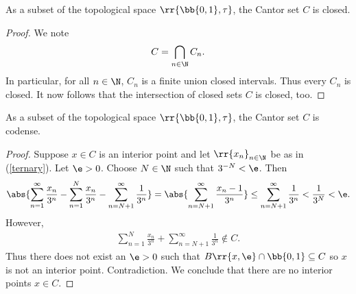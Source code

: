 \documentclass{article}
\begin{document}
\begin{claim*}[2b]
	As a subset of the topological space $\rr{\bb{0,1},\tau}$, the Cantor set $C$ is closed.
	\begin{proof}
		We note
		\begin{align*}
			C = \bigcap_{n\in\N} C_n.
		\end{align*}
		In particular, for all $n\in\N$, $C_n$ is a finite union closed intervals. Thus every
		$C_n$ is closed. It now follows that the intersection of closed sets $C$ is closed, too.
	\end{proof}
\end{claim*}

\begin{claim*}[2c]
	As a subset of the topological space $\rr{\bb{0,1},\tau}$, the Cantor set $C$ is codense.
	\begin{proof}
		Suppose $x\in C$ is an interior point and let $\rr{x_n}_{n\in\N}$ be as in (\ref{ternary}).
		Let $\e>0$. Choose $N\in\N$ such that
		$3^{-N}<\e$. Then
		\begin{align} \label{middle}
			\abs{\sum_{n=1}^{\infty} \frac{x_n}{3^n} - \sum_{n=1}^{N} \frac{x_n}{3^n} - \sum_{n=N+1}^{\infty} \frac{1}{3^n}}
			= \abs{\sum_{n =N+1}^{\infty} \frac{x_n - 1}{3^n}}
			\leq \sum_{n=N+1}^{\infty}\frac{1}{3^n}
			<\frac{1}{3^N}
			<\e.
		\end{align}
		However,
		\begin{align*}
			\sum_{n=1}^N \frac{x_n}{3^n} + \sum_{n=N+1}^{\infty} \frac{1}{3^n} \not\in C.
		\end{align*}
		Thus there does not exist an $\e>0$ such that $B\rr{x,\e}\cap\bb{0,1}\subseteq C$
		so $x$ is not an interior point. Contradiction. We conclude that there are no interior
		points $x\in C$.
	\end{proof}
\end{claim*}
\end{document}

